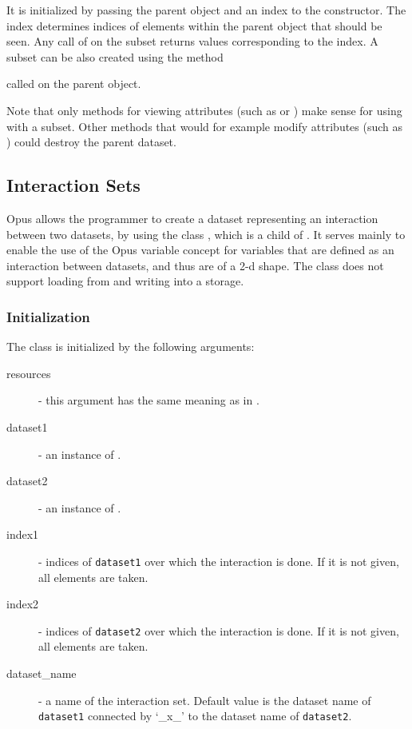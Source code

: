 It is initialized by passing the parent object and an index to the
constructor.  The index determines indices of elements within the parent
object that should be seen. Any call of  \attributesindex on the subset returns
values corresponding to the index.
A subset can be also created using the  method {
called on the parent object. 

Note that only methods for viewing attributes (such as  or ) make sense
for using with a subset. Other
methods that would for example modify attributes (such as ) could destroy the parent dataset.

\subsection{Interaction Sets}
\label{sec:interaction-set}
%
Opus allows the programmer to create a dataset representing
an interaction between two datasets, \datasetindex by using the class
, which is a child of . \datasetindex It serves mainly
to enable the use of the Opus variable \variablesindex concept for variables \variablesindex
that are defined as an interaction between datasets, \datasetindex and thus are of a 2-d
shape. The class does not support loading from and writing into a storage.

\subsubsection{Initialization}
The class is initialized by the following arguments:
\begin{description}
\item[resources] - this argument has the same meaning as in . \datasetindex
\item[dataset1] - an instance of . \datasetindex
\item[dataset2] - an instance of . \datasetindex
\item[index1] - indices of \verb|dataset1| over which the interaction is
  done. If it is not given, all elements are taken.
\item[index2] - indices of \verb|dataset2| over which the interaction is
  done. If it is not given, all elements are taken.
\item[dataset_name] - a name of the interaction set. Default value is the
  dataset \datasetindex name of  \verb|dataset1| connected by `_x_' to the dataset \datasetindex name of
  \verb|dataset2|.
\end{description}

}
